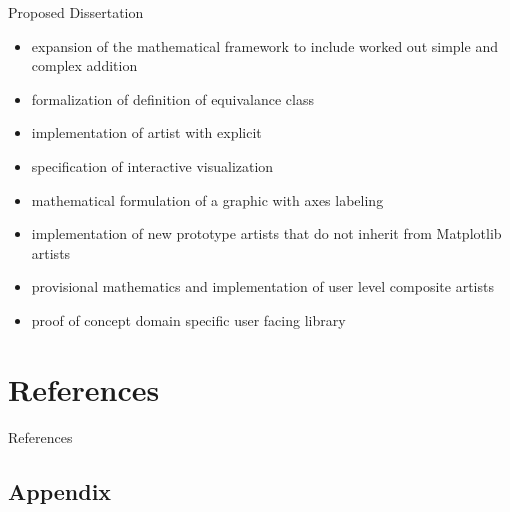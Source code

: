 \documentclass[xcolor={dvipsnames}, handout]{beamer}
\begin{document}
\begin{frame}{Proposed Dissertation}
\begin{itemize}
    \item expansion of the mathematical framework to include worked out simple and complex addition
    \item formalization of definition of equivalance class \vartisteq
    \item implementation of artist with explicit \vindex\
    \item specification of interactive visualization
    \item mathematical formulation of a graphic with axes labeling
    \item implementation of new prototype artists that do not inherit from Matplotlib artists
    \item provisional mathematics and implementation of user level composite artists
    \item proof of concept domain specific user facing library 
\end{itemize}
\end{frame}

\section{References}
\begin{frame}[allowframebreaks]{References}
\printbibliography
\end{frame}
\appendix 
\subsection{Appendix}
\end{document}
